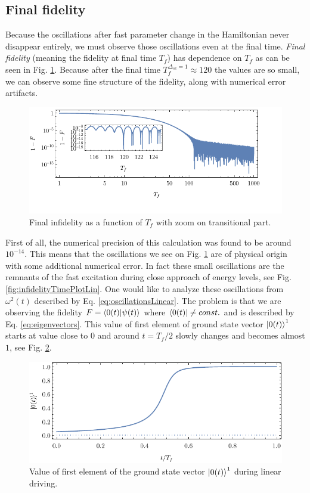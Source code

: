 \subsection{Final fidelity}
Because the oscillations after fast parameter change in the Hamiltonian never disappear entirely, we must observe those oscillations even at the final time. \emph{Final fidelity} (meaning the fidelity at final time $T_f$) has dependence on $T_f$ as can be seen in Fig. \ref{fig:infidelityTfPlotLogLinCombined}. Because after the final time $T_f^{\Delta_{sc}=1}\approx 120$ the values are so small, we can observe some fine structure of the fidelity, along with numerical error artifacts.
\begin{figure}[H]
    \centering
    \includegraphics[scale=1.2]{../img/infidelityTfPlotLogLinCombined1.pdf}
    \caption{Final infidelity as a function of $T_f$ with zoom on transitional part.}
    \label{fig:infidelityTfPlotLogLinCombined}
\end{figure}

First of all, the numerical precision of this calculation was found to be around $10^{-14}$. This means that the oscillations we see on Fig. \ref{fig:infidelityTfPlotLogLinCombined} are of physical origin with some additional numerical error. In fact these small oscillations are the remnants of the fast excitation during close approach of energy levels, see Fig. \ref{fig:infidelityTimePlotLin}. One would like to analyze these oscillations from $\omega^2(t)$ described by Eq. \ref{eq:oscillationsLinear}. The problem is that we are observing the fidelity $F=\braket{0(t)|\psi(t)}$ where $\bra{0(t)}\neq const.$ and is described by Eq. \ref{eq:eigenvectors}. This value of first element of ground state vector $\ket{0(t)}^1$ starts at value close to $0$ and around $t=T_f/2$ slowly changes and becomes almost $1$, see Fig. \ref{fig:zeroState}.
\begin{figure}[H]
    \centering
    \includegraphics[scale=1.2]{../img/zeroState.pdf}
    \caption{Value of first element of the ground state vector $\ket{0(t)}^1$ during linear driving.}
    \label{fig:zeroState}
\end{figure}


